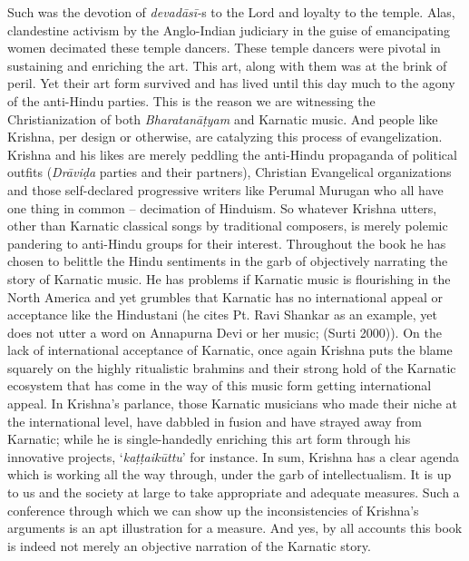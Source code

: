 Such was the devotion of \textit{devadāsī-}s to the Lord and loyalty to the temple. Alas, clandestine activism by the Anglo-Indian judiciary in the guise of emancipating women decimated these temple dancers. These temple dancers were pivotal in sustaining and enriching the art. This art, along with them was at the brink of peril. Yet their art form survived and has lived until this day much to the agony of the anti-Hindu parties. This is the reason we are witnessing the Christianization of both \textit{Bharatanāṭyam} and Karnatic music. And people like Krishna, per design or otherwise, are catalyzing this process of evangelization. Krishna and his likes are merely peddling the anti-Hindu propaganda of political outfits (\textit{Drāviḍa} parties and their partners), Christian Evangelical organizations and those self-declared progressive writers like Perumal Murugan who all have one thing in common – decimation of Hinduism. So whatever Krishna utters, other than Karnatic classical songs by traditional composers, is merely polemic pandering to anti-Hindu groups for their interest. Throughout the book he has chosen to belittle the Hindu sentiments in the garb of objectively narrating the story of Karnatic music. He has problems if Karnatic music is flourishing in the North America and yet grumbles that Karnatic has no international appeal or acceptance like the Hindustani (he cites Pt. Ravi Shankar as an example, yet does not utter a word on Annapurna Devi or her music; (Surti 2000)). On the lack of international acceptance of Karnatic, once again Krishna puts the blame squarely on the highly ritualistic brahmins and their strong hold of the Karnatic ecosystem that has come in the way of this music form getting international appeal. In Krishna’s parlance, those Karnatic musicians who made their niche at the international level, have dabbled in fusion and have strayed away from Karnatic; while he is single-handedly enriching this art form through his innovative projects, ‘\textit{kaṭṭaikūttu}’ for instance. In sum, Krishna has a clear agenda which is working all the way through, under the garb of intellectualism. It is up to us and the society at large to take appropriate and adequate measures. Such a conference through which we can show up the inconsistencies of Krishna’s arguments is an apt illustration for a measure. And yes, by all accounts this book is indeed not merely an objective narration of the Karnatic story.


